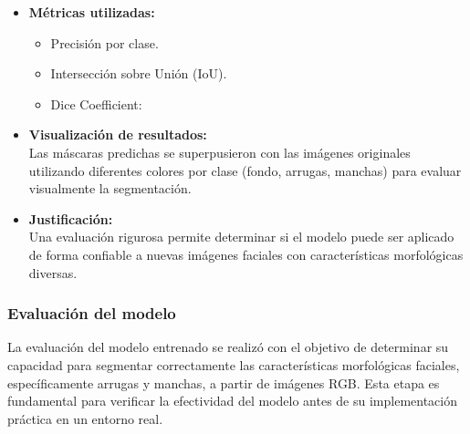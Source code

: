 \begin{itemize}
  \item \textbf{Métricas utilizadas:}
  \begin{itemize}
    \item Precisión por clase.
    \item Intersección sobre Unión (IoU).
    \item Dice Coefficient:
  \end{itemize}

  \item \textbf{Visualización de resultados:} \\
  Las máscaras predichas se superpusieron con las imágenes originales utilizando diferentes colores por clase (fondo, arrugas, manchas) para evaluar visualmente la segmentación.

  \item \textbf{Justificación:} \\
  Una evaluación rigurosa permite determinar si el modelo puede ser aplicado de forma confiable a nuevas imágenes faciales con características morfológicas diversas.
\end{itemize}

\subsubsection{Evaluación del modelo}
La evaluación del modelo entrenado se realizó con el objetivo de determinar su capacidad para segmentar correctamente las características morfológicas faciales, específicamente arrugas y manchas, a partir de imágenes RGB. Esta etapa es fundamental para verificar la efectividad del modelo antes de su implementación práctica en un entorno real.

